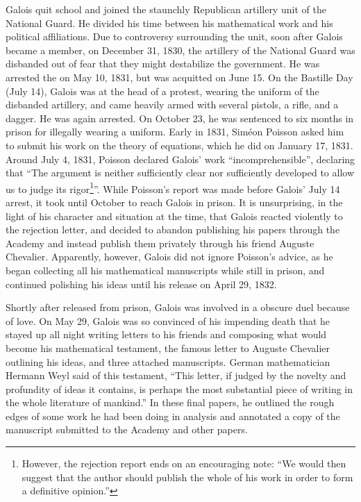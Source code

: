 \documentclass[b5paper]{article}
\begin{document}
Galois quit school and joined the staunchly Republican artillery unit of the National Guard. He divided his time between his mathematical work and his political affiliations. Due to controversy surrounding the unit, soon after Galois became a member, on December 31, 1830, the artillery of the National Guard was disbanded out of fear that they might destabilize the government. He was arrested the on May 10, 1831, but was acquitted on June 15. On the Bastille Day (July 14), Galois was at the head of a protest, wearing the uniform of the disbanded artillery, and came heavily armed with several pistols, a rifle, and a dagger. He was again arrested. On October 23, he was sentenced to six months in prison for illegally wearing a uniform. Early in 1831, Siméon Poisson asked him to submit his work on the theory of equations, which he did on January 17, 1831. Around July 4, 1831, Poisson declared Galois' work ``incomprehensible'', declaring that ``The argument is neither sufficiently clear nor sufficiently developed to allow us to judge its rigor\footnote{However, the rejection report ends on an encouraging note: ``We would then suggest that the author should publish the whole of his work in order to form a definitive opinion.''\cite{Wiki-Galois}}''. While Poisson's report was made before Galois' July 14 arrest, it took until October to reach Galois in prison. It is unsurprising, in the light of his character and situation at the time, that Galois reacted violently to the rejection letter, and decided to abandon publishing his papers through the Academy and instead publish them privately through his friend Auguste Chevalier. Apparently, however, Galois did not ignore Poisson's advice, as he began collecting all his mathematical manuscripts while still in prison, and continued polishing his ideas until his release on April 29, 1832.

Shortly after released from prison, Galois was involved in a obscure duel because of love. On May 29, Galois was so convinced of his impending death that he stayed up all night writing letters to his friends and composing what would become his mathematical testament, the famous letter to Auguste Chevalier outlining his ideas, and three attached manuscripts. German mathematician Hermann Weyl said of this testament, ``This letter, if judged by the novelty and profundity of ideas it contains, is perhaps the most substantial piece of writing in the whole literature of mankind.'' In these final papers, he outlined the rough edges of some work he had been doing in analysis and annotated a copy of the manuscript submitted to the Academy and other papers.
\end{document}
